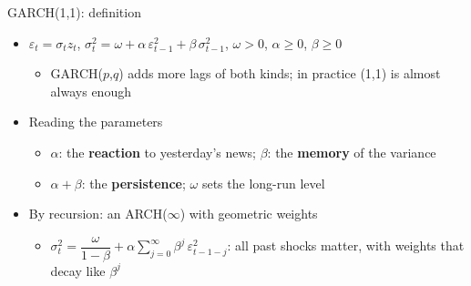 \begin{frame}{GARCH(1,1): definition}
\itemsize{\small}
\begin{itemize}
    \item $\varepsilon_t = \sigma_t z_t$, \quad $\sigma_t^2 = \omega + \alpha\,\varepsilon_{t-1}^2 + \beta\,\sigma_{t-1}^2$, \quad $\omega > 0$, $\alpha \ge 0$, $\beta \ge 0$
    \begin{itemize}
        \item GARCH($p$,$q$) adds more lags of both kinds; in practice (1,1) is almost always enough
    \end{itemize}
    \item Reading the parameters
    \begin{itemize}
        \item $\alpha$: the \textbf{reaction} to yesterday's news; $\beta$: the \textbf{memory} of the variance
        \item $\alpha + \beta$: the \textbf{persistence}; $\omega$ sets the long-run level
    \end{itemize}
    \item By recursion: an ARCH($\infty$) with geometric weights
    \begin{itemize}
        \item $\sigma_t^2 = \dfrac{\omega}{1 - \beta} + \alpha\sum_{j=0}^{\infty}\beta^j\,\varepsilon_{t-1-j}^2$: all past shocks matter, with weights that decay like $\beta^j$
    \end{itemize}
\end{itemize}
\end{frame}


